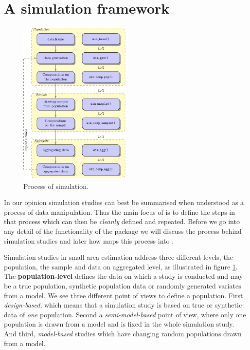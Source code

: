 \documentclass[article]{ajs}
\begin{document}
\section{A simulation framework}
%
\begin{figure}
\begin{center}
\includegraphics[width=0.5\textwidth]{flowdiagram}
\end{center}
\caption{\label{fig:flowdiagram}Process of simulation.} 
\end{figure}
%
In our opinion simulation studies can best be summarised when understood as a process of data manipulation. Thus the main focus of  is to define the steps in that process which can then be \textit{cleanly} defined and repeated. Before we go into any detail of the functionality of the package we will discuss the process behind simulation studies and later how  maps this process into .

Simulation studies in small area estimation address three different levels, the population, the sample and data on aggregated level, as illustrated in figure \ref{fig:flowdiagram}. The \textbf{population-level} defines the data on which a study is conducted and may be a true population, synthetic population data or randomly generated variates from a model. We see three different point of views to define a population. First \textit{design-based}, which means that a simulation study is based on true or synthetic data of \textit{one} population. Second a \textit{semi-model-based} point of view, where only one population is drawn from a model and is fixed in the whole simulation study. And third, \textit{model-based} studies which have changing random populations drawn from a model.
\end{document}
